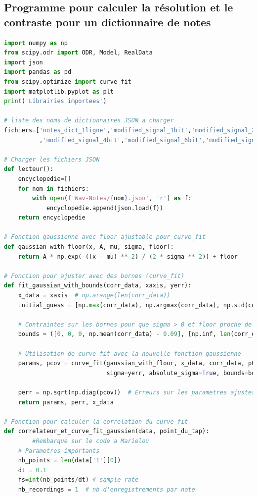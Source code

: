 \documentclass[11pt,letterpaper]{article}
\begin{document}
\subsection{Programme pour calculer la résolution et le contraste pour un dictionnaire de notes}

\begin{lstlisting}[language=python]
import numpy as np
from scipy.odr import ODR, Model, RealData
import json
import pandas as pd
from scipy.optimize import curve_fit
import matplotlib.pyplot as plt
print('Librairies importees')

# liste des noms de dictionnaires JSON a charger
fichiers=['notes_dict_1ligne','modified_signal_1bit','modified_signal_2bit','modified_signal_3bit'
          ,'modified_signal_4bit','modified_signal_6bit','modified_signal_8bit','modified_signal_16bit']

# Charger les fichiers JSON
def lecteur():
    encyclopedie=[]
    for nom in fichiers:
        with open(f'Wav-Notes/{nom}.json', 'r') as f:
            encyclopedie.append(json.load(f))
    return encyclopedie 

# Fonction gaussienne avec floor ajustable pour curve_fit
def gaussian_with_floor(x, A, mu, sigma, floor):
    return A * np.exp(-((x - mu) ** 2) / (2 * sigma ** 2)) + floor

# Fonction pour ajuster avec des bornes (curve_fit)
def fit_gaussian_with_bounds(corr_data, xaxis, yerr):
    x_data = xaxis  # np.arange(len(corr_data))
    initial_guess = [np.max(corr_data), np.argmax(corr_data), np.std(corr_data), np.mean(corr_data)]  # [amplitude, mean, sigma, offset]

    # Contraintes sur les bornes pour que sigma > 0 et floor proche de la moyenne des donnees
    bounds = ([0, 0, 0, np.mean(corr_data) - 0.09], [np.inf, len(corr_data), np.inf, np.mean(corr_data) + 0.09])

    # Utilisation de curve_fit avec la nouvelle fonction gaussienne
    params, pcov = curve_fit(gaussian_with_floor, x_data, corr_data, p0=initial_guess,
                             sigma=yerr, absolute_sigma=True, bounds=bounds, maxfev=10000)

    perr = np.sqrt(np.diag(pcov))  # Erreurs sur les parametres ajustes
    return params, perr, x_data

# Fonction pour calculer la correlation du curve_fit
def correlateur_et_curve_fit_gaussien(data, point_du_tap):
        #Rembarque sur le code a Marielou
    # Parametres importants
    nb_points = len(data['1'][0])  
    dt = 0.1
    fs=int(nb_points/dt) # sample rate
    nb_recordings = 1  # nb d'enregistrements par note


\end{lstlisting}
\end{document}
